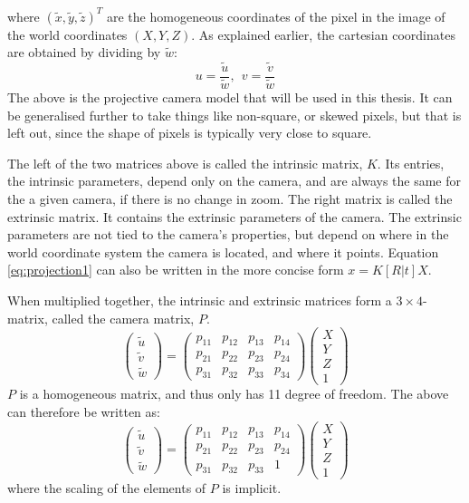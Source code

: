 where $(\tilde{x},\tilde{y},\tilde{z})^T$ are the homogeneous coordinates of the pixel in the image of the world coordinates $(X,Y,Z)$.
As explained earlier, the cartesian coordinates are obtained by dividing by $\tilde{w}$:
$$
u = \frac{\tilde{u}}{\tilde{w}},~~v = \frac{\tilde{v}}{\tilde{w}}
$$
The above is the projective camera model that will be used in this thesis. 
It can be generalised further to take things like non-square, or skewed pixels, but that is left out, since the shape of pixels is typically very close to square.

The left of the two matrices above is called the intrinsic matrix, $K$.
Its entries, the intrinsic parameters, depend only on the camera, and are always the same for the a given camera, if there is no change in zoom.
The right matrix is called the extrinsic matrix.
It contains the extrinsic parameters of the camera.
The extrinsic parameters are not tied to the camera's properties, but depend on where in the world coordinate system the camera is located, and where it points.
Equation \ref{eq:projection1} can also be written in the more concise form $x = K[R|t]X$.

When multiplied together, the intrinsic and extrinsic matrices form a $3\times4$-matrix, called the camera matrix, $P$.
\begin{equation} \label{eq:projection2}
\begin{pmatrix} \tilde{u} \\ \tilde{v} \\ \tilde{w} \end{pmatrix} =
\begin{pmatrix} p_{11} & p_{12} & p_{13} & p_{14} \\
 				p_{21} & p_{22} & p_{23} & p_{24} \\
				p_{31} & p_{32} & p_{33} & p_{34} \end{pmatrix}
\begin{pmatrix}X \\Y \\Z \\1\end{pmatrix}
\end{equation}
$P$ is a homogeneous matrix, and thus only has 11 degree of freedom.
The above can therefore be written as:
\begin{equation}\label{eq:projection3}
\begin{pmatrix} \tilde{u} \\ \tilde{v} \\ \tilde{w} \end{pmatrix} =
\begin{pmatrix} p_{11} & p_{12} & p_{13} & p_{14} \\
 				p_{21} & p_{22} & p_{23} & p_{24} \\
				p_{31} & p_{32} & p_{33} & 1 \end{pmatrix}
\begin{pmatrix}X \\Y \\Z \\1\end{pmatrix}
\end{equation}
where the scaling of the elements of $P$ is implicit. \cite[153-165]{hartley-zisserman}

